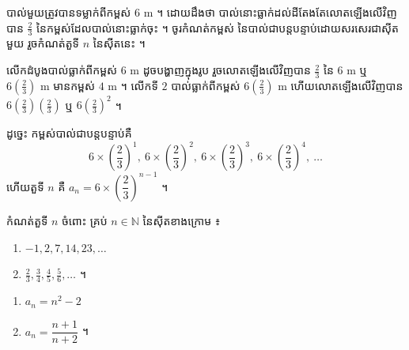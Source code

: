 \begin{example}[លំហាត់គំរូ ២]
បាល់មួយត្រូវបានទម្លាក់ពីកម្ពស់ $6\text{ m}$ ។ ដោយដឹងថា បាល់នោះធ្លាក់ដល់ដីតែងតែលោតឡើងលើវិញបាន $\frac{2}{3}$ នៃកម្ពស់ដែលបាល់នោះធ្លាក់ចុះ ។ ចូរកំណត់កម្ពស់ នៃបាល់ជាបន្តបន្ទាប់ដោយសរសេរជាស៊ីតមួយ រួចកំណត់តួទី $n$ នៃស៊ីតនេះ ។

\begin{center}
\end{center}
\end{example}
\ans
លើកដំបូងបាល់ធ្លាក់ពីកម្ពស់ $6\text{ m}$ ដូចបង្ហាញក្នុងរូប រួចលោតឡើងលើវិញបាន $\frac{2}{3}$ នៃ $6\text{ m}$ ឬ $6\left(\frac{2}{3}\right)\text{ m}$ មានកម្ពស់ $4\text{ m}$ ។ លើកទី $2$ បាល់ធ្លាក់ពីកម្ពស់ $6\left(\frac{2}{3}\right)\text{ m}$ ហើយលោតឡើងលើវិញបាន $6\left(\frac{2}{3}\right)\left(\frac{2}{3}\right)$ ឬ $6\left(\frac{2}{3}\right)^2$ ។

ដូច្នេះ កម្ពស់បាល់ជាបន្តបន្ទាប់គឺ
\[
6 \times \left(\frac{2}{3}\right)^1,\ 6 \times \left(\frac{2}{3}\right)^2,\ 6 \times \left(\frac{2}{3}\right)^3,\ 6 \times \left(\frac{2}{3}\right)^4,\ \ldots
\]
ហើយតួទី $n$ គឺ $a_n = 6 \times \left(\dfrac{2}{3}\right)^{n-1}$ ។

\begin{pro}
កំណត់តួទី $n$ ចំពោះ គ្រប់ $n \in \mathbb{N}$ នៃស៊ីតខាងក្រោម ៖
\begin{enumerate}[a]
  \item $-1, 2, 7, 14, 23, \ldots$
  \item $\frac{2}{3}, \frac{3}{4}, \frac{4}{5}, \frac{5}{6}, \ldots$ ។
\end{enumerate}
\ans
\begin{enumerate}[a]
  \item $a_n = n^2 - 2$
  \item $a_n = \dfrac{n+1}{n+2}$ ។
\end{enumerate}
\end{pro}

